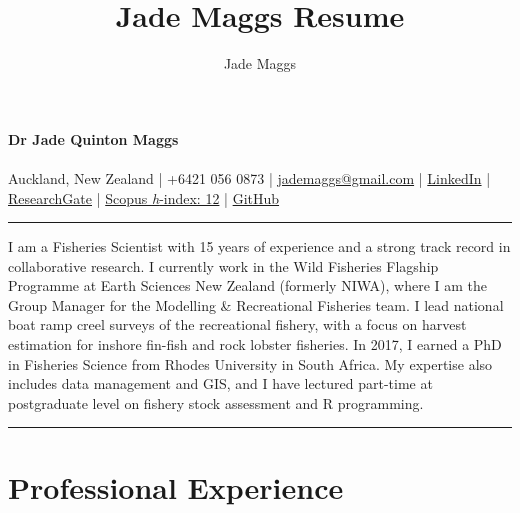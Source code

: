 \documentclass[10pt,a4paper]{article}
\author{Jade Maggs}
\title{Jade Maggs Resume}
\begin{document}
	
\noindent
{\huge \textbf{Dr Jade Quinton Maggs}}\\
\\
{\small Auckland, New Zealand | +6421 056 0873 | \href{mailto:jademaggs@gmail.com}{jademaggs@gmail.com} |
\href{https://www.linkedin.com/in/jade-maggs-phd-5a091729/}{LinkedIn} |
			\href{https://www.researchgate.net/profile/Jade_Maggs}{ResearchGate} | 
			\href{https://www.scopus.com/authid/detail.uri?authorId=55250227800}{Scopus \textit{h}-index: 12} |
			\href{https://github.com/jademaggs?tab=repositories}{GitHub}}\\
\hrule
\vspace{8pt}
\noindent
I am a Fisheries Scientist with 15 years of experience and a strong track record in collaborative research. I currently work in the Wild Fisheries Flagship Programme at Earth Sciences New Zealand (formerly NIWA), where I am the Group Manager for the Modelling \& Recreational Fisheries team. I lead national boat ramp creel surveys of the recreational fishery, with a focus on harvest estimation for inshore fin-fish and rock lobster fisheries. In 2017, I earned a PhD in Fisheries Science from Rhodes University in South Africa. My expertise also includes data management and GIS, and I have lectured part-time at postgraduate level on fishery stock assessment and R programming. \\
\hrule
\vspace{8pt}
\noindent


\section*{Professional Experience}
\end{document}
